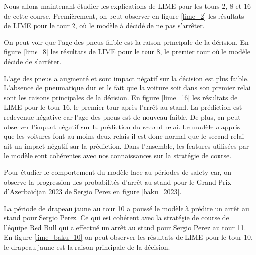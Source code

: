 Nous allons maintenant étudier les explications de LIME pour les tours 2, 8 et 16 de cette course.
Premièrement, on peut observer en figure \ref{lime_2} les résultats de LIME pour le tour 2, où le modèle à décidé de ne pas s'arrêter.

On peut voir que l'age des pneus faible est la raison principale de la décision. En figure \ref{lime_8} les résultats de LIME pour le tour 8, le premier tour où le modèle décide de s'arrêter.

L'age des pneus a augmenté et sont impact négatif sur la décision est plus faible. L'absence de pneumatique dur et le fait que la voiture soit dans son
premier relai sont les raisons principales de la décision. En figure \ref{lime_16} les résultats de LIME pour le tour 16, le premier tour après l'arrêt au stand.
La prédiction est redevenue négative car l'age des pneus est de nouveau faible. De plus, on peut observer l'impact négatif sur la prédiction du second relai.
Le modèle a appris que les voitures font au moins deux relais il est donc normal que le second relai ait un impact négatif sur la prédiction.
Dans l'ensemble, les features utilisées par le modèle sont cohérentes avec nos connaissances sur la stratégie de course.

Pour étudier le comportement du modèle face au périodes de safety car, on observe la progression des probabilités d'arrêt au stand pour le Grand Prix d'Azerbaïdjan 2023 de Sergio Perez en figure \ref{baku_2023}.


La période de drapeau jaune au tour 10 a poussé le modèle à prédire un arrêt au stand pour Sergio Perez.
Ce qui est cohérent avec la stratégie de course de l'équipe Red Bull qui a effectué un arrêt au stand pour Sergio Perez au tour 11.
En figure \ref{lime_baku_10} on peut observer les résultats de LIME pour le tour 10, le drapeau jaune est la raison principale de la décision.

